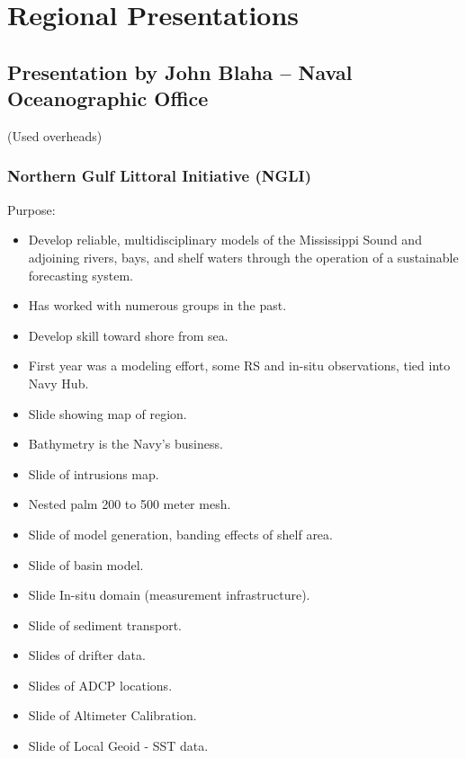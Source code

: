 \section{Regional Presentations}
\label{I,regions}

\subsection{Presentation by John Blaha -- Naval Oceanographic Office}

(Used overheads)
 
\subsubsection{Northern Gulf Littoral Initiative (NGLI)}

Purpose:
\begin{itemize}
\item Develop reliable, multidisciplinary models of the Mississippi Sound and adjoining rivers, 
bays, and shelf waters through the operation of a sustainable forecasting system.

\item Has worked with numerous groups in the past.

\item Develop skill toward shore from sea.

\item First year was a modeling effort, some RS and in-situ observations, tied into Navy Hub.

\item Slide showing map of region.

\item Bathymetry is the Navy's business.

\item Slide of intrusions map.

\item Nested palm 200 to 500 meter mesh.

\item Slide of model generation, banding effects of shelf area.

\item Slide of basin model.

\item Slide In-situ domain (measurement infrastructure).

\item Slide of sediment transport. 

\item Slides of drifter data.

\item Slides of ADCP locations.

\item Slide of Altimeter Calibration.

\item Slide of Local Geoid - SST data.

\end{itemize}

